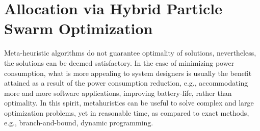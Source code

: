



\section*{Allocation via Hybrid Particle Swarm Optimization}\label{rc_pso}
Meta-heuristic algorithms do not guarantee optimality of solutions, nevertheless, the solutions can be deemed satisfactory. In the case of minimizing power consumption, what is more appealing to system designers is usually the benefit attained as a result of the power consumption reduction, e.g., accommodating more and more software applications, improving battery-life, rather than optimality. In this spirit, metahuristics can be useful to solve complex and large optimization problems, yet in reasonable time, as compared to exact methods, e.g., branch-and-bound, dynamic programming.


